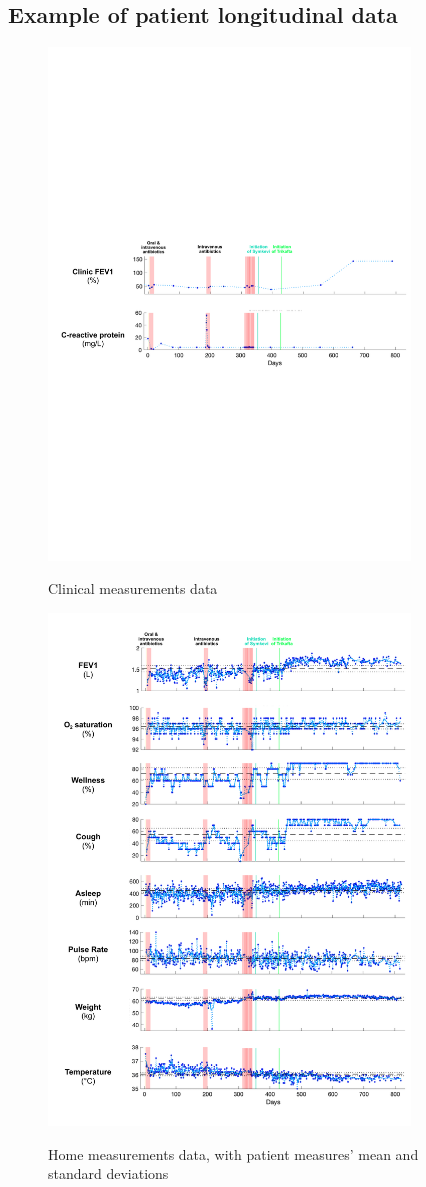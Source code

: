 \begin{appendices}
\chapter{Example of patient longitudinal data}

    \begin{figure}[!h]
    \caption{Clinical measurements data}
    \centering
    \includegraphics[width=96mm]{images/clinicdata.pdf}
    \label{fig:clinic}
    \end{figure}
    
    \begin{figure}[!h]
    \caption{Home measurements data, with patient measures' mean and standard deviations}
    \centering
    \includegraphics[width=96mm]{images/homedata.pdf}
    \label{fig:home}
    \end{figure}


\end{appendices}
